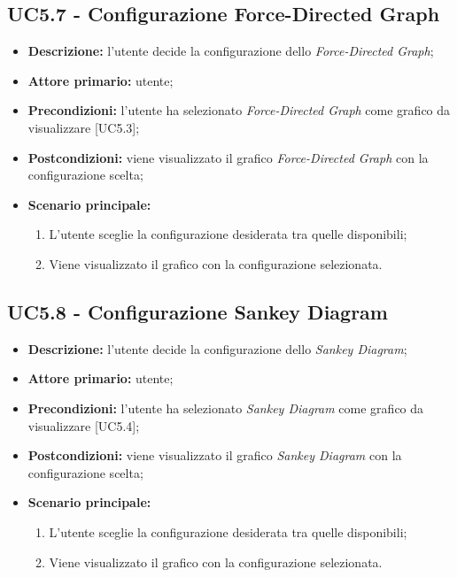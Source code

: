 \subsection{UC5.7 - Configurazione Force-Directed Graph}
\begin{itemize}
    \item \textbf{Descrizione:} l'utente decide la configurazione dello \textit{Force-Directed Graph};
    \item \textbf{Attore primario:} utente;
    \item \textbf{Precondizioni:} l'utente ha selezionato \textit{Force-Directed Graph} come grafico da visualizzare [UC5.3];
    \item \textbf{Postcondizioni:} viene visualizzato il grafico \textit{Force-Directed Graph} con la configurazione scelta;
    \item \textbf{Scenario principale:}
    \begin{enumerate}
      \item L'utente sceglie la configurazione desiderata tra quelle disponibili;
      \item Viene visualizzato il grafico con la configurazione selezionata.
    \end{enumerate}
\end{itemize}

\subsection{UC5.8 - Configurazione Sankey Diagram}
\begin{itemize}
    \item \textbf{Descrizione:} l'utente decide la configurazione dello \textit{Sankey Diagram};
    \item \textbf{Attore primario:} utente;
    \item \textbf{Precondizioni:} l'utente ha selezionato \textit{Sankey Diagram} come grafico da visualizzare [UC5.4];
    \item \textbf{Postcondizioni:} viene visualizzato il grafico \textit{Sankey Diagram} con la configurazione scelta;
    \item \textbf{Scenario principale:}
    \begin{enumerate}
      \item L'utente sceglie la configurazione desiderata tra quelle disponibili;
      \item Viene visualizzato il grafico con la configurazione selezionata.
    \end{enumerate}
\end{itemize}


